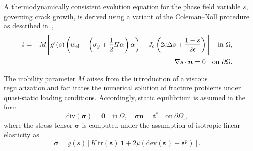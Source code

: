 \documentclass[pdflatex,sn-mathphys-num]{sn-jnl}%
\theoremstyle{thmstyleone}%
\theoremstyle{thmstyletwo}%
\theoremstyle{thmstylethree}%
\begin{document}

A thermodynamically consistent evolution equation for the phase field variable $s$, governing crack growth, is derived using a variant of the Coleman--Noll procedure as described in~\cite{noll_3d_2020},
\begin{align}
    \begin{split}
    \dot{s} = -M \Bigg[
    g'(s)\left(w_{\rm{el}} + \left(\sigma_y+\dfrac{1}{2}H\alpha\right)\alpha\right)
    - J_c\left(2\epsilon\Delta{s} + \dfrac{1-s}{2\epsilon}\right)
    \Bigg]
    \quad \text{in} \ \Omega, \\
    \nabla{s}\cdot{\boldsymbol{n}} = 0 \quad \text{on} \ \partial\Omega.
    \label{eq:evolution_s}
    \end{split}
\end{align}

The mobility parameter $M$ arises from the introduction of a viscous regularization and facilitates the numerical solution of fracture problems under quasi-static loading conditions. 
Accordingly, static equilibrium is assumed in the form
\begin{equation}
    \text{div}(\boldsymbol{\sigma}) = \boldsymbol{0} \quad \text{in} \ \Omega, 
    \quad 
    \boldsymbol{\sigma}\boldsymbol{n} = \boldsymbol{t}^* 
    \quad \text{on} \ \partial\Omega_t,
    \label{eq:equilibrium}
\end{equation}
where the stress tensor $\boldsymbol{\sigma}$ is computed under the assumption of isotropic linear elasticity as
\begin{equation}
    \boldsymbol{\sigma} = g(s)\left[
    K\,\text{tr}(\boldsymbol{\varepsilon})\,\boldsymbol{1}
    + 2\mu\left(\text{dev}(\boldsymbol{\varepsilon}) - \boldsymbol{\varepsilon}^p\right)
    \right].
    \label{eq:sigma_plast}
\end{equation}
\end{document}
